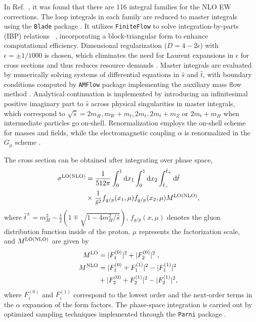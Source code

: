 In Ref.~\cite{Bi:2023bnq}, it was found that there are 116 integral families for the NLO EW corrections. The loop integrals in each family are reduced to master integrals using the {\tt Blade} package \cite{Blade}. It utilizes {\tt FiniteFlow} \cite{Peraro:2019svx} to solve integration-by-parts (IBP) relations ~\cite{Chetyrkin:1981qh}, incorporating a block-triangular form \cite{Liu:2018dmc,Guan:2019bcx} to enhance computational efficiency. Dimensional regularization ($D=4-2\epsilon$) with  $\epsilon=\pm1/1000$ is chosen, which eliminates the need for Laurent expansions in $\epsilon$ for cross sections and thus reduces resource demands \cite{Liu:2022chg,Liu:2022mfb}. Master integrals are evaluated by numerically solving systems of differential equations \cite{Kotikov:1990kg,Remiddi:1997ny,Caffo:2008aw,Czakon:2008zk,Lee:2014ioa,Moriello:2019yhu,Hidding:2020ytt,Armadillo:2022ugh} in $\hat{s}$ and $\hat{t}$,  with boundary conditions computed by {\tt AMFlow} package \cite{Liu:2022chg} implementing the auxiliary mass flow method \cite{Liu:2022mfb,Liu:2021wks,Liu:2017jxz}. Analytical continuation is implemented by introducing an infinitesimal positive imaginary part to $\hat{s}$ across physical singularities in master integrals, which  correspond to $\sqrt{\hat{s}}=2m_H,m_W+m_t,2m_t,2m_t+m_Z$ or $2m_t+m_H$ when intermediate particles go on-shell. Renormalization employs the on-shell scheme for masses and fields, while the electromagnetic coupling $\alpha$ is renormalized in the $G_{\mu}$ scheme \cite{Denner:2019vbn}.


The cross section can be obtained after integrating over phase space,
\begin{align}\label{eq:Xsection}
\sigma^{\rm LO(NLO)} &= \frac{1}{512\pi}\int_0^1 \mathrm{d}x_{1}\int_0^1 \mathrm{d}x_{2} \int^{\hat{t}_{+}}_{\hat{t}_{-}}\mathrm{d}\hat{t} \nonumber \\
& \times \frac{1}{\hat{s}^{2}}f_{g/p}(x_{1},\mu)f_{g/p}(x_{2},\mu) M^{\rm LO(NLO)},
\end{align}
where $\hat{t}^{\pm}=m^{2}_{H}-\frac{\hat{s}}{2}(1\mp\sqrt{1-{4m^{2}_{H}}/{\hat{s}}})$, $f_{g/p}(x,\mu)$ denotes the gluon distribution function inside of the proton, $\mu$ represents the factorization scale, and $M^{\rm LO(NLO)}$ are given by
\begin{align}
M^{\rm LO}&=|F_{1}^{(0)}|^2+|F_{2}^{(0)}|^2 \;,\\
M^{\rm NLO}&=|F_{1}^{(0)}+F_{1}^{(1)}|^2-|F_{1}^{(1)}|^2\nonumber\\
&+|F_{2}^{(0)}+F_{2}^{(1)}|^2  -|F_{2}^{(1)}|^2,
\end{align}
where $F_i^{(0)}$ and $F_i^{(1)}$ correspond to the lowest order and the next-order terms in the $\alpha$ expansion of the form factors. The phase-space integration is carried out by optimized sampling techniques implemented through the {\tt Parni} package \cite{vanHameren:2007pt}.


